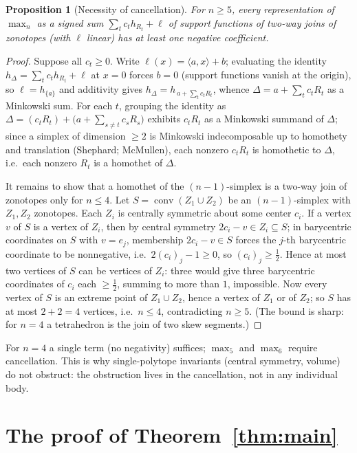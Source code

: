 \documentclass[11pt]{article}
\newtheorem{proposition}{Proposition}
\theoremstyle{definition}
\DeclareMathOperator{\conv}{conv}
\begin{document}
\begin{proposition}[Necessity of cancellation]\label{prop:neg}
For $n\ge 5$, every representation of $\max_n$ as a signed sum $\sum_t c_t h_{R_t}+\ell$ of support
functions of two-way joins of zonotopes (with $\ell$ linear) has at least one negative coefficient.
\end{proposition}

\begin{proof}
Suppose all $c_t\ge 0$. Write $\ell(x)=\langle a,x\rangle+b$; evaluating the identity
$h_\Delta=\sum_t c_t h_{R_t}+\ell$ at $x=0$ forces $b=0$ (support functions vanish at the origin), so
$\ell=h_{\{a\}}$ and additivity gives $h_\Delta=h_{\,a+\sum_t c_t R_t}$, whence $\Delta=a+\sum_t c_t R_t$ as
a Minkowski sum. For each $t$, grouping the identity as $\Delta=(c_t R_t)+\big(a+\sum_{s\ne t}c_s R_s\big)$
exhibits $c_t R_t$ as a Minkowski summand of $\Delta$; since a simplex of dimension $\ge 2$ is Minkowski
indecomposable up to homothety and translation (Shephard; McMullen), each nonzero $c_t R_t$ is homothetic
to $\Delta$, i.e.\ each nonzero $R_t$ is a homothet of $\Delta$.

It remains to show that a homothet of the $(n-1)$-simplex is a two-way join of zonotopes only for
$n\le 4$. Let $S=\conv(Z_1\cup Z_2)$ be an $(n-1)$-simplex with $Z_1,Z_2$ zonotopes. Each $Z_i$ is centrally
symmetric about some center $c_i$. If a vertex $v$ of $S$ is a vertex of $Z_i$, then by central symmetry
$2c_i-v\in Z_i\subseteq S$; in barycentric coordinates on $S$ with $v=e_j$, membership $2c_i-v\in S$ forces
the $j$-th barycentric coordinate to be nonnegative, i.e.\ $2(c_i)_j-1\ge 0$, so $(c_i)_j\ge\tfrac12$.
Hence at most two vertices of $S$ can be vertices of $Z_i$: three would give three barycentric coordinates
of $c_i$ each $\ge\tfrac12$, summing to more than $1$, impossible. Now every vertex of $S$ is an extreme
point of $Z_1\cup Z_2$, hence a vertex of $Z_1$ or of $Z_2$; so $S$ has at most $2+2=4$ vertices, i.e.\
$n\le 4$, contradicting $n\ge 5$. (The bound is sharp: for $n=4$ a tetrahedron is the join of two skew
segments.)
\end{proof}

For $n=4$ a single term (no negativity) suffices; $\max_5$ and $\max_6$ require cancellation. This is why
single-polytope invariants (central symmetry, volume) do not obstruct: the obstruction lives in the
cancellation, not in any individual body.

\section{The proof of Theorem~\ref{thm:main}}
\end{document}
